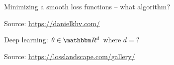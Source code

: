\begin{frame}
    

    Minimizing a smooth loss functions  -- what algorithm?
    
    \begin{figure}
       \begin{center}
       \end{center}
    \end{figure}

    Source: \url{https://danielkhv.com/}

\end{frame}


\begin{frame}

    Deep learning: $\theta \in \RR^d$ where $d = ?$
    
    \begin{figure}
       \begin{center}
       \end{center}
    \end{figure}

    Source: \url{https://losslandscape.com/gallery/}

\end{frame}


